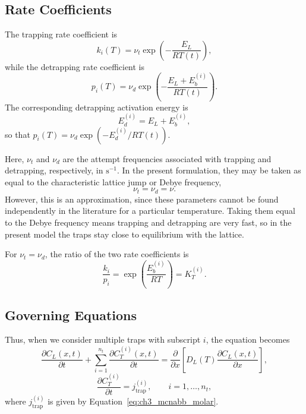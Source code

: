 \documentclass[a4paper,12pt,oneside]{report}
\begin{document}
\subsection{Rate Coefficients}

The trapping rate coefficient is
\begin{equation}
k_i(T)
=
\nu_t
\exp\left(
-\frac{E_L}{RT(t)}
\right),
\label{eq:ch3_arrhenius_ki}
\end{equation}
while the detrapping rate coefficient is
\begin{equation}
p_i(T)
=
\nu_d
\exp\left(
-\frac{E_L+E_b^{(i)}}{RT(t)}
\right).
\label{eq:ch3_arrhenius_pi}
\end{equation}
The corresponding detrapping activation energy is
\begin{equation}
E_d^{(i)}
=
E_L+E_b^{(i)},
\label{eq:ch3_detrapping_energy}
\end{equation}
so that $p_i(T)=\nu_d\exp\left(-E_d^{(i)}/RT(t)\right)$.

Here, $\nu_t$ and $\nu_d$ are the attempt frequencies associated with trapping and detrapping, respectively, in $\mathrm{s^{-1}}$. In the present formulation, they may be taken as equal to the characteristic lattice jump or Debye frequency,
\begin{equation}
\nu_t=\nu_d=\nu.
\label{eq:ch3_debye_frequency}
\end{equation}
However, this is an approximation, since these parameters cannot be found independently in the literature for a particular temperature. Taking them equal to the Debye frequency means trapping and detrapping are very fast, so in the present model the traps stay close to equilibrium with the lattice.

For $\nu_t=\nu_d$, the ratio of the two rate coefficients is
\begin{equation}
\frac{k_i}{p_i}=\exp\left(\frac{E_b^{(i)}}{RT}\right)=K_T^{(i)}.
\label{eq:ch3_kp_ratio}
\end{equation}

\subsection{Governing Equations}

Thus, when we consider multiple traps with subscript $i$, the equation becomes
\begin{equation}
\frac{\partial C_L(x,t)}{\partial t}
+
\sum_{i=1}^{n_t}
\frac{\partial C_T^{(i)}(x,t)}{\partial t}
=
\frac{\partial}{\partial x}
\left[
D_L(T)
\frac{\partial C_L(x,t)}{\partial x}
\right],
\label{eq:ch3_governing_pde}
\end{equation}
\begin{equation}
\frac{\partial C_T^{(i)}}{\partial t}
=
j_{\mathrm{trap}}^{(i)},
\qquad i=1,\ldots,n_t,
\label{eq:ch3_trap_pde}
\end{equation}
where $j_{\mathrm{trap}}^{(i)}$ is given by Equation~\eqref{eq:ch3_mcnabb_molar}.
\end{document}
